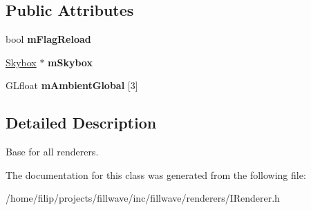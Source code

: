 \subsection*{Public Attributes}
\begin{DoxyCompactItemize}
\item 
\mbox{\label{classflw_1_1flf_1_1IRenderer_aefe02e2d025ff1ce6e7553c2c1f9b7fa}} 
bool {\bfseries m\+Flag\+Reload}
\item 
\mbox{\label{classflw_1_1flf_1_1IRenderer_a14ec6383fdb9e4edcc8c27d4290c4cdd}} 
\hyperlink{classflw_1_1flf_1_1Skybox}{Skybox} $\ast$ {\bfseries m\+Skybox}
\item 
\mbox{\label{classflw_1_1flf_1_1IRenderer_a3e09bfcf3e5c8c6c42dd40b782b7906f}} 
G\+Lfloat {\bfseries m\+Ambient\+Global} \mbox{[}3\mbox{]}
\end{DoxyCompactItemize}


\subsection{Detailed Description}
Base for all renderers. 

The documentation for this class was generated from the following file\+:\begin{DoxyCompactItemize}
\item 
/home/filip/projects/fillwave/inc/fillwave/renderers/I\+Renderer.\+h\end{DoxyCompactItemize}

